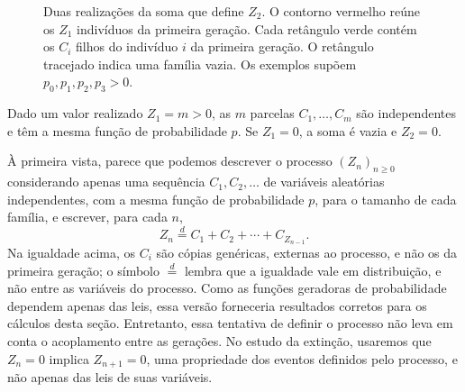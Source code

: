 \documentclass[12pt,portuguese]{article}
\theoremstyle{definition}
\theoremstyle{plainexercise}
\theoremstyle{starredexercise}
\theoremstyle{definition}
\begin{document}
\begin{figure}[H]
  \caption{Duas realizações da soma que define $Z_2$. O contorno vermelho
    reúne os $Z_1$ indivíduos da primeira geração. Cada retângulo verde
    contém os $C_i$ filhos do indivíduo $i$ da primeira geração. O retângulo tracejado indica uma
    família vazia. Os exemplos supõem
    \mbox{$p_0,p_1,p_2,p_3>0$}.}
  \label{fig:soma-aleatoria-z2}
\end{figure}

Dado um valor realizado $Z_1=m>0$, as $m$ parcelas $C_1,\ldots,C_m$ são
independentes e têm a mesma função de probabilidade $p$.
Se $Z_1=0$, a soma é vazia e $Z_2=0$.

\bigskip

À primeira vista, parece que podemos descrever o processo
$(Z_n)_{n\geqslant 0}$ considerando apenas uma sequência $C_1,C_2,\ldots$
de variáveis aleatórias independentes, com a mesma função de probabilidade
$p$, para o tamanho de cada família, e escrever, para cada $n$,
\[
Z_n \overset{d}{=} C_1+C_2+\cdots+C_{Z_{n-1}}.
\]
Na igualdade acima, os $C_i$ são cópias genéricas, externas ao processo, e
não os da primeira geração; o símbolo $\overset{d}{=}$ lembra que a
igualdade vale em distribuição, e não entre as variáveis do processo. Como
as funções geradoras de probabilidade dependem apenas das leis, essa versão
forneceria resultados corretos para os cálculos desta seção. Entretanto,
essa tentativa de definir o processo não leva em conta o acoplamento entre
as gerações. No estudo da extinção, usaremos que $Z_n=0$ implica $Z_{n+1}=0$,
uma propriedade dos eventos definidos pelo processo, e não apenas das leis
de suas variáveis.
\end{document}
